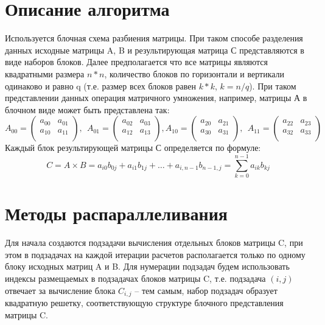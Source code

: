 \documentclass[12pt]{article}
\begin{document}
\newpage

\section*{Описание алгоритма}
Используется блочная схема разбиения матрицы. При таком способе разделения данных исходные матрицы A, B и результирующая матрица С представляются в виде наборов блоков. Далее предполагается что все матрицы являются квадратными размера $n*n$, количество блоков по горизонтали и вертикали одинаково и равно q (т.е. размер всех блоков равен $k*k$, $k=n/q$). При таком представлении данных операция матричного умножения, например, матрицы А в блочном виде может быть представлена так:\\
 \begin{equation}A_{00}= \left( \begin{matrix}
a_{00}  &  a_{01}\\
a_{10}  &  a_{11}\\
\end{matrix}
 \right) ,~~A_{01}= \left( \begin{matrix}
a_{02}  &   a_{03}\\
a_{12}  &   a_{13}\\
\end{matrix}
 \right) , A_{10}= \left( \begin{matrix}
a_{20}  &  a_{21}\\
a_{30}  &  a_{31}\\
\end{matrix}
 \right) ,~~A_{11}= \left( \begin{matrix}
a_{22}  &  a_{23}\\
a_{32}  &  a_{33}\\
\end{matrix}
 \right)  \end{equation} 
Каждый блок результирующей матрицы С определяется по формуле:
\begin{equation}
  C=A \times B=a_{i0}b_{0j}+a_{i1}b_{1j}+ \ldots +a_{i,n-1}b_{n-1,j}= \sum _{k=0}^{n-1}a_{ik}b_{kj} 
\end{equation}


\newpage

\section*{Методы распараллеливания}
Для начала создаются подзадачи вычисления отдельных блоков матрицы C,  при этом в подзадачах на каждой итерации расчетов располагается только по одному блоку исходных матриц A и B. Для нумерации подзадач будем использовать индексы размещаемых в подзадачах блоков матрицы C, т.е. подзадача $(i,j)$ отвечает за вычисление блока $C_{i,j}$ – тем самым, набор подзадач образует квадратную решетку, соответствующую структуре блочного представления матрицы C.  
\end{document}
